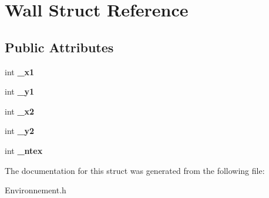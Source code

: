 \hypertarget{structWall}{}\section{Wall Struct Reference}
\label{structWall}
\subsection*{Public Attributes}
\begin{DoxyCompactItemize}
\item 
\mbox{\label{structWall_acb9b4e999c8f035543f7f3b4ed99cfe5}} 
int {\bfseries \+\_\+x1}
\item 
\mbox{\label{structWall_aa79f9d9da68a74b10ceaf988c8d46a5e}} 
int {\bfseries \+\_\+y1}
\item 
\mbox{\label{structWall_a0b396b774da28ae1e5d3b2f4ff32eff1}} 
int {\bfseries \+\_\+x2}
\item 
\mbox{\label{structWall_a8a362d4ca002122ba47b2d06d770bcd1}} 
int {\bfseries \+\_\+y2}
\item 
\mbox{\label{structWall_a0ded071e2fbfc366e2cd136b46cfff18}} 
int {\bfseries \+\_\+ntex}
\end{DoxyCompactItemize}


The documentation for this struct was generated from the following file\+:\begin{DoxyCompactItemize}
\item 
Environnement.\+h\end{DoxyCompactItemize}
